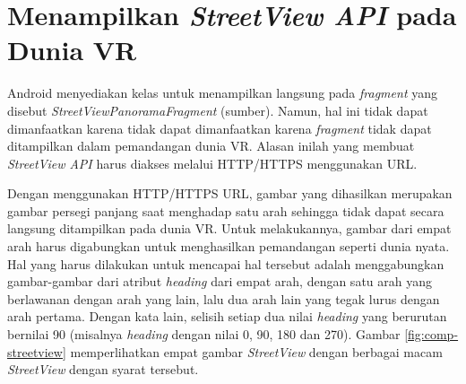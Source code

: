 \section{Menampilkan \textit{StreetView API} pada Dunia VR}
Android menyediakan kelas untuk menampilkan langsung pada \textit{fragment} yang disebut \textit{StreetViewPanoramaFragment} (sumber). Namun, hal ini tidak dapat dimanfaatkan karena tidak dapat dimanfaatkan karena \textit{fragment} tidak dapat ditampilkan dalam pemandangan dunia VR. Alasan inilah yang membuat \textit{StreetView API} harus diakses melalui HTTP/HTTPS menggunakan URL. 

Dengan menggunakan HTTP/HTTPS URL, gambar yang dihasilkan merupakan gambar persegi panjang saat menghadap satu arah sehingga tidak dapat secara langsung ditampilkan pada dunia VR. Untuk melakukannya, gambar dari empat arah harus digabungkan untuk menghasilkan pemandangan seperti  dunia nyata. Hal yang harus dilakukan untuk mencapai hal tersebut adalah menggabungkan gambar-gambar dari atribut \textit{heading} dari empat arah, dengan satu arah yang berlawanan dengan arah yang lain, lalu dua arah lain yang tegak lurus dengan arah pertama. Dengan kata lain, selisih setiap dua nilai \textit{heading} yang berurutan  bernilai 90 (misalnya \textit{heading} dengan nilai 0, 90, 180 dan 270). Gambar \ref{fig:comp-streetview} memperlihatkan empat gambar \textit{StreetView} dengan berbagai macam \textit{StreetView} dengan syarat tersebut.


